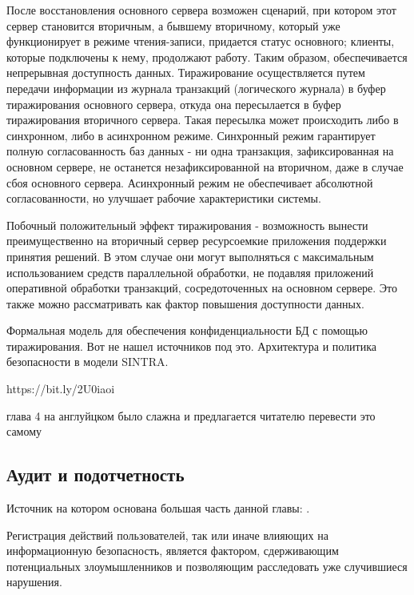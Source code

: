 После восстановления основного сервера возможен сценарий, при котором этот сервер становится вторичным, а бывшему вторичному, который уже функционирует в режиме чтения-записи, придается статус основного; клиенты, которые подключены к нему, продолжают работу. Таким образом, обеспечивается непрерывная доступность данных.
Тиражирование осуществляется путем передачи информации из журнала транзакций (логического журнала) в буфер тиражирования основного сервера, откуда она пересылается в буфер тиражирования вторичного сервера. Такая пересылка может происходить либо в синхронном, либо в асинхронном режиме. Синхронный режим гарантирует полную согласованность баз данных - ни одна транзакция, зафиксированная на основном сервере, не останется незафиксированной на вторичном, даже в случае сбоя основного сервера. Асинхронный режим не обеспечивает абсолютной согласованности, но улучшает рабочие характеристики системы.

Побочный положительный эффект тиражирования - возможность вынести преимущественно на вторичный сервер ресурсоемкие приложения поддержки принятия решений. В этом случае они могут выполняться с максимальным использованием средств параллельной обработки, не подавляя приложений оперативной обработки транзакций, сосредоточенных на основном сервере. Это также можно рассматривать как фактор повышения доступности данных.

Формальная модель для обеспечения конфиденциальности БД с помощью тиражирования.
Вот не нашел источников под это.
Архитектура и политика безопасности в модели SINTRA.

https://bit.ly/2U0iaoi

глава 4 на англуйцком было слажна и предлагается читателю перевести это самому
\subsection{Аудит и подотчетность}
Источник на котором основана большая часть данной главы: \autocite{InfoSecDBMS}.

Регистрация действий пользователей, так или иначе влияющих на информационную безопасность, является фактором, сдерживающим потенциальных злоумышленников и позволяющим расследовать уже случившиеся нарушения.

